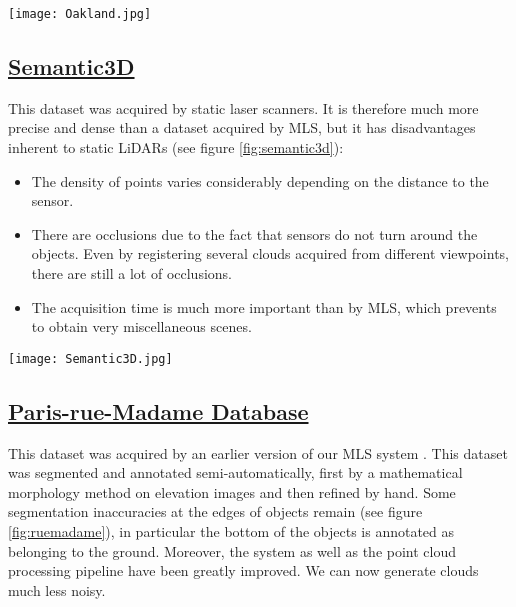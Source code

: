\documentclass[a4paper, 10pt, journal]{article}
\begin{document}
\begin{center}\centering
 \texttt{[image: Oakland.jpg]}
\end{center}

\subsection{\href{http://www.semantic3d.net/}{Semantic3D} \cite{hackel2016fast}}\label{subsec:semantic3d}
This dataset was acquired by static laser scanners. It is therefore much more precise and dense than a dataset acquired by MLS, but it has disadvantages inherent to static LiDARs (see figure \ref{fig:semantic3d}):
\begin{itemize}
 \item The density of points varies considerably depending on the distance to the sensor.
 \item There are occlusions due to the fact that sensors do not turn around the objects. Even by registering several clouds acquired from different viewpoints, there are still a lot of occlusions.
 \item The acquisition time is much more important than by MLS, which prevents to obtain very miscellaneous scenes.
\end{itemize}

\begin{center}
 \texttt{[image: Semantic3D.jpg]}
\end{center}


\subsection{\href{http://cmm.ensmp.fr/~serna/rueMadameDataset.html}{Paris-rue-Madame Database} \cite{serna2014paris}}\label{subsec:ruemadame}
This dataset was acquired by an earlier version of our MLS system \cite{goulette2006integrated}. 
This dataset was segmented and annotated semi-automatically, first by a mathematical morphology method on elevation images \cite{serna2014paris} and then refined by hand. Some segmentation inaccuracies at the edges of objects remain (see figure \ref{fig:ruemadame}), in particular the bottom of the objects is annotated as belonging to the ground.
Moreover, the system as well as the point cloud processing pipeline have been greatly improved. We can now generate clouds much less noisy.
\end{document}
